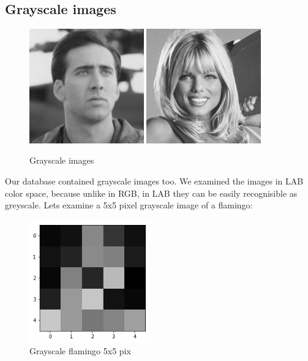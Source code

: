 \documentclass[12pt]{article}
\begin{document}
\subsection{Grayscale images}
\begin{figure}[H]
	\centering
	\captionsetup{justification=centering}
	\includegraphics[height=140pt]{graysc1}
	\hspace{60pt}
	\includegraphics[height=140pt]{graysc2}
	\caption{Grayscale images}	
	\label{fig:grayscale_eg}
\end{figure}
Our database contained grayscale images too. We examined the images in LAB color space, because unlike in RGB, in LAB they can be easily recognisible as greyscale. Lets examine a 5x5 pixel grayscale image of a flamingo:

\begin{figure}[H]
	\centering
	\captionsetup{justification=centering}
	\includegraphics[height=150pt]{flamingo}
	\caption{Grayscale flamingo 5x5 pix}	
	\label{fig:grayscale_flam}
\end{figure}
\end{document}
